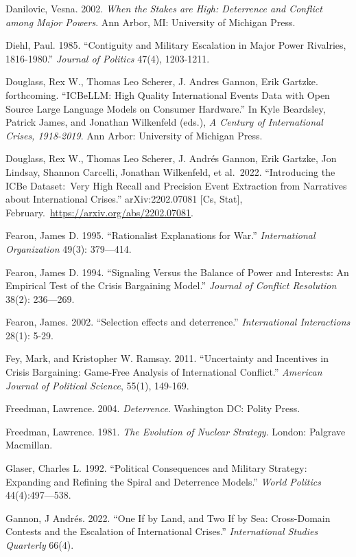\documentclass[
  letterpaper,
  DIV=11,
  numbers=noendperiod]{scrartcl}
\begin{document}
Danilovic, Vesna. 2002. \emph{When the Stakes are High: Deterrence and
Conflict among Major Powers}. Ann Arbor, MI: University of Michigan
Press.

Diehl, Paul. 1985. ``Contiguity and Military Escalation in Major Power
Rivalries, 1816-1980.'' \emph{Journal of Politics} 47(4), 1203-1211.

Douglass, Rex W., Thomas Leo Scherer, J. Andres Gannon, Erik Gartzke.
forthcoming. ``ICBeLLM: High Quality International Events Data with Open
Source Large Language Models on Consumer Hardware.'' In Kyle Beardsley,
Patrick James, and Jonathan Wilkenfeld (eds.), \emph{A Century of
International Crises, 1918-2019}. Ann Arbor: University of Michigan
Press.

Douglass, Rex W., Thomas Leo Scherer, J. Andrés Gannon, Erik Gartzke,
Jon Lindsay, Shannon Carcelli, Jonathan Wilkenfeld, et al.~2022.
``Introducing the ICBe Dataset:~Very High Recall and Precision Event
Extraction from Narratives about International Crises.''
arXiv:2202.07081 {[}Cs, Stat{]},
February.~\href{https://urldefense.com/v3/__https:/arxiv.org/abs/2202.07081__;!!Mih3wA!CLsJAkIaG18LhmH8jhnNw4GVB0of31s_n91IbLKW_lSvbtP4jy3sO8Kgd4zgE_R38RC2ALcN0AsDgo9rF1LIew$}{https://arxiv.org/abs/2202.07081}.

Fearon, James D. 1995. ``Rationalist Explanations for War.''
\emph{International Organization} 49(3): 379---414.

Fearon, James D. 1994. ``Signaling Versus the Balance of Power and
Interests: An Empirical Test of the Crisis Bargaining Model.''
\emph{Journal of Conflict Resolution} 38(2): 236---269.

Fearon, James. 2002. ``Selection effects and deterrence.''
\emph{International Interactions} 28(1): 5-29.

Fey, Mark, and Kristopher W. Ramsay. 2011. ``Uncertainty and Incentives
in Crisis Bargaining: Game‐Free Analysis of International Conflict.''
\emph{American Journal of Political Science}, 55(1), 149-169.

Freedman, Lawrence. 2004. \emph{Deterrence}. Washington DC: Polity
Press.

Freedman, Lawrence. 1981. \emph{The Evolution of Nuclear Strategy}.
London: Palgrave Macmillan.~~

Glaser, Charles L. 1992. ``Political Consequences and Military Strategy:
Expanding and Refining the Spiral and Deterrence Models.'' \emph{World
Politics} 44(4):497---538.

Gannon, J Andrés. 2022. ``One If by Land, and Two If by Sea:
Cross-Domain Contests and the Escalation of International Crises.''
\emph{International Studies Quarterly} 66(4).
\end{document}
